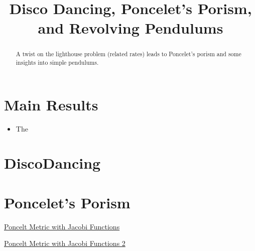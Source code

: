 \documentclass{ximera}
\title{Disco Dancing, Poncelet's Porism, and Revolving Pendulums}
\begin{document}
\begin{abstract}
A twist on the lighthouse problem (related rates) leads to Poncelet's porism and some insights into simple pendulums.
\end{abstract}
\maketitle

\section*{Main Results}

\begin{itemize}

\item{The}

\end{itemize}


\section*{DiscoDancing}

\section*{Poncelet's Porism}


\begin{onlineOnly}
    \begin{center}
\end{center}
\end{onlineOnly}

\href{https://www.desmos.com/calculator/q16ify3gtm}{Poncelt Metric with Jacobi Functions}



\begin{onlineOnly}
    \begin{center}
\end{center}
\end{onlineOnly}

\href{https://www.desmos.com/calculator/hm5zop04ob}{Poncelt Metric with Jacobi Functions 2}



\begin{onlineOnly}
    \begin{center}
\end{center}
\end{onlineOnly}
\end{document}
